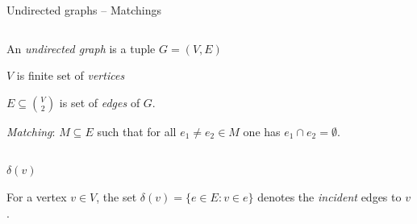 \begin{frame}{Undirected graphs -- Matchings} 


   \begin{columns}
    \begin{column}{.5\textwidth}
      
\begin{definition} 
  An \emph{undirected graph} is a tuple $G = (V,E)$

  \medskip 
  $V$ is 
  finite set of  \emph{vertices}

  \medskip 
  $E\subseteq\binom{V}{2}$ is 
  set of \emph{edges} of $G$.

  \medskip 
  \emph{Matching}: 
  $M\subseteq E$ such that for all $e_1\neq e_2\in M$ one has $e_1\cap e_2 = \emptyset$. 
\end{definition}
    \end{column}
    \begin{column}{.5\textwidth}
    \end{column}       
  \end{columns}
\end{frame}




\begin{frame}{$δ(v)$}

  
For a vertex $v \in V$, the set $\delta(v) = \{e \in E \colon v \in e\}$ denotes
the \emph{incident} edges to $v$. 
  
\end{frame}



